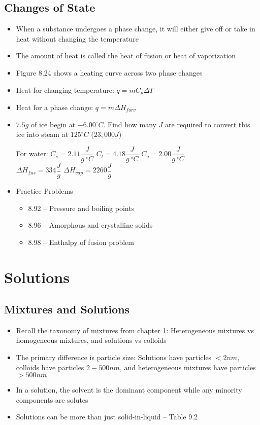 \documentclass[12pt, openany, letterpaper]{memoir}
\begin{document}
\section{Changes of State}
\begin{itemize}
	\item When a substance undergoes a phase change, it will either give off or take in heat without changing the temperature
	\item The amount of heat is called the heat of fusion or heat of vaporization
	\item Figure 8.24 shows a heating curve across two phase changes
	\item Heat for changing temperature: $q=mC_p\Delta T$
	\item Heat for a phase change: $q=m\Delta H_{f or v}$
	\item $7.5g$ of ice begin at $-6.00^\circ C$. Find how many $J$ are required to convert this ice into steam at $125^\circ C$ ($23,000J$)
	
	For water: $C_{s}=2.11\dfrac{J}{g~^\circ C}$ \hspace{1em} $C_{l}=4.18\dfrac{J}{g~^\circ C}$ \hspace{1em} $C_{g}=2.00\dfrac{J}{g~^\circ C}$ \\ \hphantom{For Water:} $\Delta H_{fus} = 334\dfrac{J}{g}$ \hspace{1em} $\Delta H_{vap} = 2260\dfrac{J}{g}$
	\item Practice Problems
	\begin{itemize}
		\item 8.92 -- Pressure and boiling points
		\item 8.96 -- Amorphous and crystalline solids
		\item 8.98 -- Enthalpy of fusion problem
	\end{itemize}
\end{itemize}

\chapter{Solutions}
\section{Mixtures and Solutions}
\begin{itemize}
	\item Recall the taxonomy of mixtures from chapter 1: Heterogeneous mixtures vs homogeneous mixtures, and solutions vs colloids
	\item The primary difference is particle size: Solutions have particles $<2nm$, colloids have particles $2-500nm$, and heterogeneous mixtures have particles $>500nm$
	\item In a solution, the solvent is the dominant component while any minority components are solutes
	\item Solutions can be more than just solid-in-liquid -- Table 9.2
\end{itemize}
\end{document}
